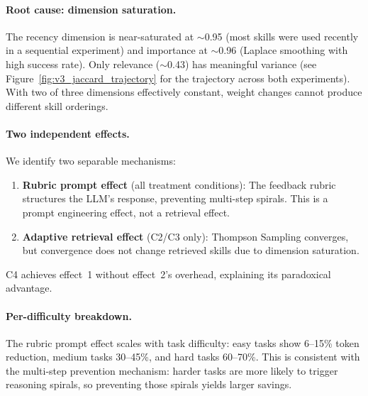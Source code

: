 \paragraph{Root cause: dimension saturation.}
The recency dimension is near-saturated at ${\sim}$0.95 (most skills were used recently in a sequential experiment) and importance at ${\sim}$0.96 (Laplace smoothing with high success rate).
Only relevance (${\sim}$0.43) has meaningful variance (see Figure~\ref{fig:v3_jaccard_trajectory} for the trajectory across both experiments).
With two of three dimensions effectively constant, weight changes cannot produce different skill orderings.

\paragraph{Two independent effects.}
We identify two separable mechanisms:
\begin{enumerate}
\item \textbf{Rubric prompt effect} (all treatment conditions): The feedback rubric structures the LLM's response, preventing multi-step spirals. This is a prompt engineering effect, not a retrieval effect.
\item \textbf{Adaptive retrieval effect} (C2/C3 only): Thompson Sampling converges, but convergence does not change retrieved skills due to dimension saturation.
\end{enumerate}
C4 achieves effect~1 without effect~2's overhead, explaining its paradoxical advantage.

\paragraph{Per-difficulty breakdown.}
The rubric prompt effect scales with task difficulty: easy tasks show 6--15\% token reduction, medium tasks 30--45\%, and hard tasks 60--70\%.
This is consistent with the multi-step prevention mechanism: harder tasks are more likely to trigger reasoning spirals, so preventing those spirals yields larger savings.
